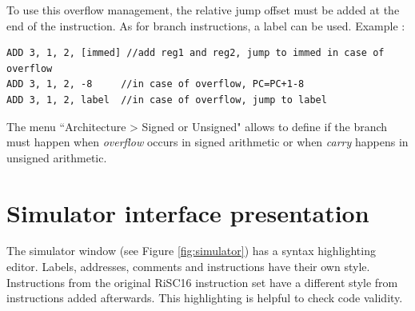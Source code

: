 \documentclass[10pt,a4paper]{article}
\theoremstyle{definition}%
\begin{document}

To use this overflow management, the relative jump offset must be added at the end of the instruction. As for branch instructions, a label can be used. Example :
\lstset{numbers=none, numberstyle=\tiny, stepnumber=5, numbersep=5pt, captionpos=b}%
\begin{lstlisting}[float=h!,caption=Examples,label=code:asm2]
ADD 3, 1, 2, [immed] //add reg1 and reg2, jump to immed in case of overflow
ADD 3, 1, 2, -8     //in case of overflow, PC=PC+1-8
ADD 3, 1, 2, label  //in case of overflow, jump to label
\end{lstlisting}

The menu ``Architecture > Signed or Unsigned" allows to define if the branch must happen when \textit{overflow} occurs in signed arithmetic or when \textit{carry} happens in unsigned arithmetic.

\section{Simulator interface presentation}
The simulator window (see Figure \vref{fig:simulator}) has a syntax highlighting editor. Labels, addresses, comments and instructions have their own style. Instructions from the original RiSC16 instruction set have a different style from instructions added afterwards. This highlighting is helpful to check code validity.
\end{document}
